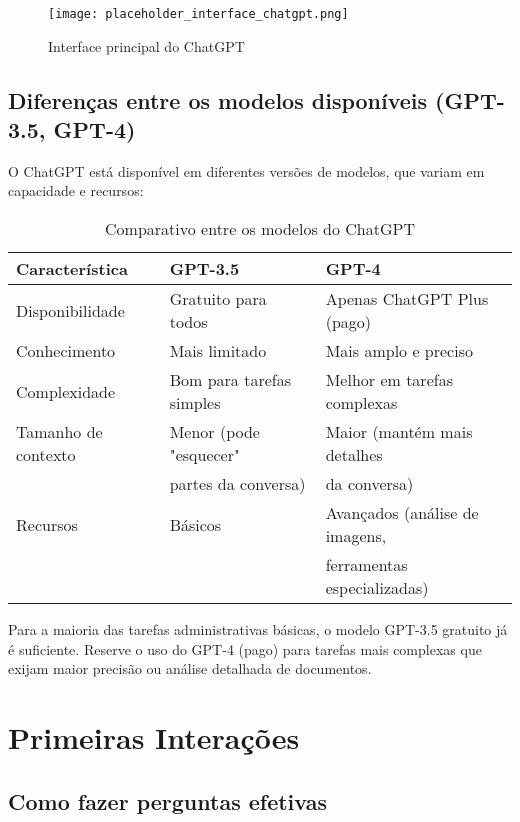 \documentclass[12pt,a4paper]{book}
\begin{document}
\begin{figure}[h]
\centering
\texttt{[image: placeholder\_interface\_chatgpt.png]}
\caption{Interface principal do ChatGPT}
\end{figure}

\subsection{Diferenças entre os modelos disponíveis (GPT-3.5, GPT-4)}

O ChatGPT está disponível em diferentes versões de modelos, que variam em capacidade e recursos:

\begin{table}[h]
\centering
\begin{tabular}{lll}
\toprule
\textbf{Característica} & \textbf{GPT-3.5} & \textbf{GPT-4} \\
\midrule
Disponibilidade & Gratuito para todos & Apenas ChatGPT Plus (pago) \\
Conhecimento & Mais limitado & Mais amplo e preciso \\
Complexidade & Bom para tarefas simples & Melhor em tarefas complexas \\
Tamanho de contexto & Menor (pode "esquecer" & Maior (mantém mais detalhes \\
 & partes da conversa) & da conversa) \\
Recursos & Básicos & Avançados (análise de imagens, \\
 &  & ferramentas especializadas) \\
\bottomrule
\end{tabular}
\caption{Comparativo entre os modelos do ChatGPT}
\end{table}

\begin{tcolorbox}[dica]
Para a maioria das tarefas administrativas básicas, o modelo GPT-3.5 gratuito já é suficiente. Reserve o uso do GPT-4 (pago) para tarefas mais complexas que exijam maior precisão ou análise detalhada de documentos.
\end{tcolorbox}

\section{Primeiras Interações}

\subsection{Como fazer perguntas efetivas}
\end{document}
